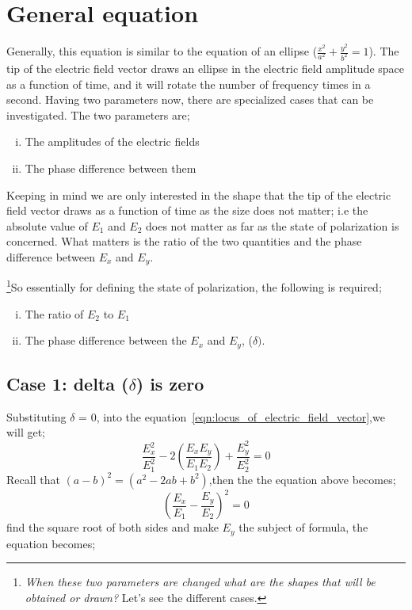 \section{General equation }
Generally, this equation is similar to the equation of an ellipse ($\frac{x^2}{a^2} + \frac{y^2}{b^2} = 1 $). The tip of the electric field vector draws an ellipse in the electric field amplitude space as a function of time, and it will rotate the number of frequency times in a second. Having two parameters now, there are specialized cases that can be investigated. The two parameters are;
\begin{enumerate}[(i)]
\item The amplitudes of the electric fields
\item The phase difference between them
\end{enumerate}
Keeping in mind we are only interested in the shape that the tip of the electric field vector draws as a function of time as the size does not matter; i.e the absolute value of $ E_1 $ and $ E_2 $ does not matter as far as the state of polarization is concerned. What matters is the ratio of the two quantities and the phase difference between $ E_x $ and $ E_y $.

\footnote{
\emph{When these two parameters are changed what are the shapes that will be obtained or drawn?} Let's see the different cases.
}So essentially for defining the state of polarization, the following is required;
\begin{enumerate}[(i)] 
\item The ratio of $ E_2 $ to $ E_1 $
\item The phase difference between the $ E_x $ and $ E_y $, ($\delta)$.
\end{enumerate}

\subsection{Case 1: delta ($\delta $) is zero}
Substituting $\delta$ = 0, into the equation~\eqref{eqn:locus_of_electric_field_vector},we will get;
\begin{equation}
\frac{E_{x}^2}{E_{1}^2} -2(\frac{E_{x}E_{y}}{E_{1}E_{2}}) + \frac{E_{y}^2}{E_{2}^2} = 0
\end{equation}
Recall that ${(a - b)}^2 = (a^2 -2ab +b^2)$,then the the equation above becomes;
\begin{equation}
{(\frac{E_x}{E_1} - \frac{E_y}{E_2})}^2 = 0
\end{equation}
find the square root of both sides and make $ E_y $ the subject of formula, the equation becomes;

